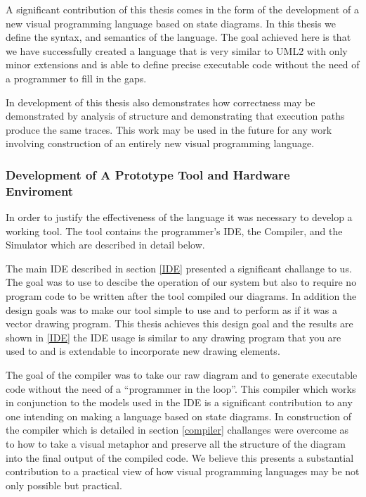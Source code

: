 A significant contribution of this thesis comes in the form of the development of \plccharts a new visual programming language based on state diagrams. In this thesis we define the syntax, and semantics of the language. The goal achieved here is that we have successfully created a language that is very similar to UML2 with only minor extensions and is able to define precise executable code without the need of a programmer to fill in the gaps.

In development of \plccharts this thesis also demonstrates how correctness may be demonstrated by analysis of structure and demonstrating that execution paths produce the same traces. This work may be used in the future for any work involving construction of an entirely new visual programming language.


\subsubsection{Development of A Prototype Tool and Hardware Enviroment}
In order to justify the effectiveness of the \plccharts language it was necessary to develop a working tool. The tool contains the programmer's IDE, the Compiler, and the Simulator which are described in detail below.

The main IDE described in section \ref{IDE} presented a significant challange to us. The goal was to use \plccharts to descibe the operation of our system but also to require no program code to be written after the tool compiled our diagrams. In addition the design goals was to make our tool simple to use and to perform as if it was a vector drawing program. This thesis achieves this design goal and the results are shown in \ref{IDE} the IDE usage is similar to any drawing program that you are used to and is extendable to incorporate new drawing elements.

The goal of the compiler was to take our raw diagram and to generate executable code without the need of a ``programmer in the loop''. This compiler which works in conjunction to the models used in the IDE is a significant contribution to any one intending on making a language based on state diagrams. In construction of the compiler which is detailed in section \ref{compiler} challanges were overcome as to how to take a visual metaphor and preserve all the structure of the diagram into the final output of the compiled code. We believe this presents a substantial contribution to a practical view of how visual programming languages may be not only possible but practical.

